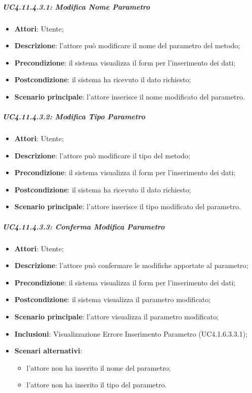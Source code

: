 \subparagraph{UC4.11.4.3.1: Modifica Nome Parametro}
\label{UC4.11.4.3.1}
\begin{itemize}
	\item \textbf{Attori}: Utente;
	\item \textbf{Descrizione}: l'attore può modificare il nome del parametro del metodo;
	\item \textbf{Precondizione}: il sistema visualizza il form per l'inserimento dei dati;
	\item \textbf{Postcondizione}: il sistema ha ricevuto il dato richiesto;
	\item \textbf{Scenario principale}: l'attore inserisce il nome modificato del parametro.
\end{itemize}

\subparagraph{UC4.11.4.3.2: Modifica Tipo Parametro}
\label{UC4.11.4.3.2}
\begin{itemize}
	\item \textbf{Attori}: Utente;
	\item \textbf{Descrizione}: l'attore può modificare il tipo del metodo;
	\item \textbf{Precondizione}: il sistema visualizza il form per l'inserimento dei dati;
	\item \textbf{Postcondizione}: il sistema ha ricevuto il dato richiesto;
	\item \textbf{Scenario principale}: l'attore inserisce il tipo modificato del parametro.
\end{itemize}

\subparagraph{UC4.11.4.3.3: Conferma Modifica Parametro}
\label{UC4.11.4.3.3}
\begin{itemize}
	\item \textbf{Attori}: Utente;
	\item \textbf{Descrizione}: l'attore può confermare le modifiche apportate al parametro;
	\item \textbf{Precondizione}: il sistema visualizza il form per l'inserimento dei dati;
	\item \textbf{Postcondizione}: il sistema visualizza il parametro modificato;
	\item \textbf{Scenario principale}: l'attore visualizza il parametro modificato;
	\item \textbf{Inclusioni}:
	Visualizzazione Errore Inserimento Parametro (UC4.1.6.3.3.1);
	\item \textbf{Scenari alternativi}:
	\begin{itemize}
		\item l'attore non ha inserito il nome del parametro;
		\item l'attore non ha inserito il tipo del parametro.
	\end{itemize}
\end{itemize}

